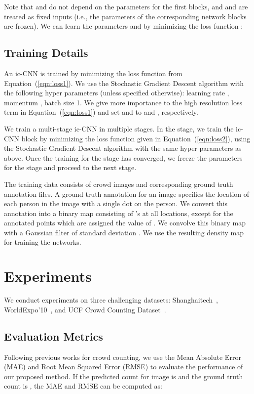 \documentclass[runningheads]{llncs}
\begin{document}
Note that  and  do not depend on the parameters for the first  blocks, and  and   are treated as fixed inputs (i.e., the parameters of the corresponding network blocks are frozen). We can learn the parameters   and  by minimizing the loss function :


\subsection{Training Details}\label{sec:TrainingDetails}
An ic-CNN is trained by minimizing the loss function  from Equation~(\ref{eqn:loss1}). We use the Stochastic Gradient Descent algorithm with the following hyper parameters (unless specified otherwise): learning rate , momentum , batch size 1. We give more importance to the high resolution loss term in Equation~(\ref{eqn:loss1}) and set  and  to  and , respectively.

We train a multi-stage ic-CNN in multiple stages. In the  stage, we train the  ic-CNN block by minimizing the loss function given in Equation~(\ref{eqn:loss2}), using the Stochastic Gradient Descent algorithm with the same hyper parameters as above. Once the training for the  stage has converged, we freeze the parameters for the  stage and proceed to the next stage. 

The training data consists of crowd images and corresponding ground truth annotation files. A ground truth annotation for an image specifies the location of each person in the image with a single dot on the person.  We convert this annotation into a binary map consisting of 's at all locations, except for the annotated points which are assigned the value  of . We convolve this binary map with a Gaussian filter of standard deviation . We use the resulting density map for training the networks.

\section{Experiments}
We conduct experiments on three challenging datasets: Shanghaitech~\cite{zhang2016single}, WorldExpo'10~\cite{zhang2015cross}, and UCF Crowd Counting Dataset~\cite{idrees2013multi}.

\subsection{Evaluation Metrics}
Following previous works for crowd counting, we use the Mean Absolute Error (MAE) and Root Mean Squared Error (RMSE) to evaluate the performance of our proposed method. If the predicted count for image  is  and
the ground truth count is , the MAE and RMSE can be computed as: 
\end{document}
